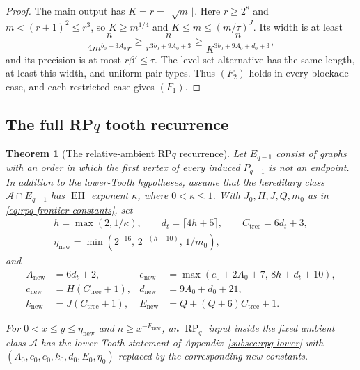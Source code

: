 \documentclass[11pt,a4paper]{article}
\newtheorem{theorem}{Theorem}[section]
\theoremstyle{definition}
\theoremstyle{remark}
\numberwithin{equation}{section}
\DeclareMathOperator{\RP}{RP}
\begin{document}
\begin{proof}
The main output has \(K=r=\lfloor \sqrt{m}\rfloor\). Here \(r\ge 2^{8}\) and \(m<(r+1)^{2}\le r^{3}\), so \(K\ge m^{1/4}\) and \(K\le m\le (m/\tau)^{J}\). Its width is at least
\[
 \frac{n}{4m^{b_{0}+3A_{0}}r}\ge\frac{n}{r^{3b_{0}+9A_{0}+3}}
 \ge\frac{n}{K^{3b_{0}+9A_{0}+d_{0}+3}},
\]
and its precision is at most \(r\beta'\le\tau\). The level-set alternative has the same length, at least this width, and uniform pair types. Thus \((F_{2})\) holds in every blockade case, and each restricted case gives \((F_{1})\).
\end{proof}
\subsection{The full \texorpdfstring{RP\(q\)}{RPq} tooth recurrence}\label{subsec:rpq-recurrence}
\begin{theorem}[The relative-ambient RP\(q\) recurrence]\label{thm:rpq}
Let \(E_{q-1}\) consist of graphs with an order in which the first vertex of every induced \(P_{q-1}\) is not an endpoint. In addition to the lower-Tooth hypotheses, assume that the hereditary class \(\mathcal A\cap  E_{q-1}\) has \(\operatorname{EH}\) exponent \(\kappa\), where \(0<\kappa\le 1\). With \(J_{0},H,J,Q,m_{0}\) as in \eqref{eq:rpq-frontier-constants}, set
\begin{equation}\label{eq:rpq-tree-constants}
\begin{gathered}
 h=\max (2,1/\kappa),\qquad d_{t}=\lceil 4h+5\rceil,\qquad C_{\mathrm{tree}}=6d_{t}+3,\\
 \eta_{\mathrm{new}}=\min (2^{-16},\,2^{-(h+10)},\,1/m_{0}),
\end{gathered}
\end{equation}
and
\begin{equation}\label{eq:rpq-new-constants}
\begin{aligned}
 A_{\mathrm{new}}&=6d_{t}+2, & e_{\mathrm{new}}&=\max (e_{0}+2A_{0}+7,\,8h+d_{t}+10),\\
 c_{\mathrm{new}}&=H(C_{\mathrm{tree}}+1), & d_{\mathrm{new}}&=9A_{0}+d_{0}+21,\\
 k_{\mathrm{new}}&=J(C_{\mathrm{tree}}+1), & E_{\mathrm{new}}&=Q+(Q+6)C_{\mathrm{tree}}+1.
\end{aligned}
\end{equation}

For \(0<x\le\allowbreak y\le\allowbreak \eta_{\mathrm{new}}\) and \(n\ge\allowbreak x^{-E_{\mathrm{new}}}\), an \(\RP_{q}\) input inside the fixed ambient class \(\mathcal A\) has the lower Tooth statement of Appendix~\ref{subsec:rpq-lower} with \((A_{0},\allowbreak c_{0},\allowbreak e_{0},\allowbreak k_{0},\allowbreak d_{0},\allowbreak E_{0},\allowbreak \eta_{0})\) replaced by the corresponding new constants.
\end{theorem}
\end{document}
